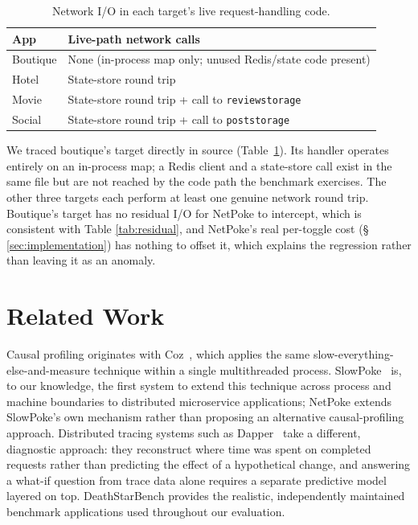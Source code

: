 \begin{table}[t]
\centering
\small
\caption{Network I/O in each target's live request-handling code.}
\label{tab:fanout}
\begin{tabular}{lp{5.2cm}}
\toprule
App & Live-path network calls \\
\midrule
Boutique & None (in-process map only; unused Redis/state code present) \\
Hotel & State-store round trip \\
Movie & State-store round trip + call to \texttt{reviewstorage} \\
Social & State-store round trip + call to \texttt{poststorage} \\
\bottomrule
\end{tabular}
\end{table}

We traced boutique's target directly in source (Table~\ref{tab:fanout}).
Its handler operates entirely on an in-process map; a Redis client and a
state-store call exist in the same file but are not reached by the code
path the benchmark exercises. The other three targets each perform at
least one genuine network round trip. Boutique's target has no residual
I/O for NetPoke to intercept, which is consistent with Table
\ref{tab:residual}, and NetPoke's real per-toggle cost (\S
\ref{sec:implementation}) has nothing to offset it, which explains the
regression rather than leaving it as an anomaly.

\section{Related Work}

Causal profiling originates with Coz~\cite{coz2015}, which applies the
same slow-everything-else-and-measure technique within a single
multithreaded process. SlowPoke~\cite{slowpoke2026} is, to our knowledge,
the first system to extend this technique across process and machine
boundaries to distributed microservice applications; NetPoke extends
SlowPoke's own mechanism rather than proposing an alternative causal-profiling
approach. Distributed tracing systems such as Dapper~\cite{dapper2010}
take a different, diagnostic approach: they reconstruct where time was
spent on completed requests rather than predicting the effect of a
hypothetical change, and answering a what-if question from trace data
alone requires a separate predictive model layered on top. DeathStarBench
\cite{deathstarbench2019} provides the realistic, independently maintained
benchmark applications used throughout our evaluation.

